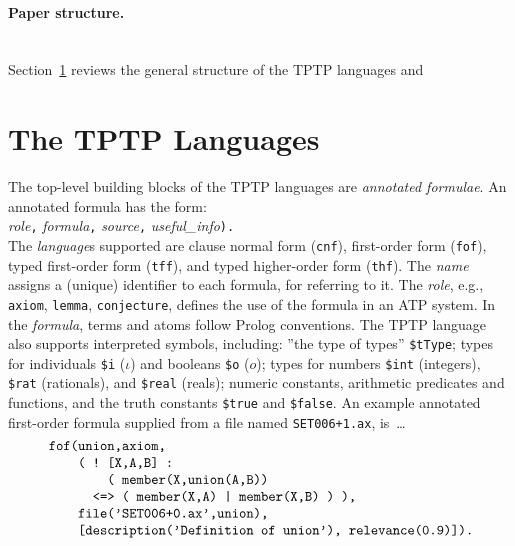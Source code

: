 \documentclass[runningheads]{llncs}
\begin{document}
\paragraph{Paper structure.}~\\
Section~\ref{TPTPLanguages} reviews the general structure of the TPTP languages and

\section{The TPTP Languages}
\label{TPTPLanguages}

The top-level building blocks of the TPTP languages are {\em annotated formulae}.
An annotated formula has the form:\\
 {\em role}{\tt ,} {\em formula}{\tt ,} 
{\em source}{\tt ,} {\em useful\_info}{\tt ).} \\ 
The {\em language}s supported are clause normal form ({\tt cnf}), first-order form ({\tt fof}), 
typed first-order form ({\tt tff}), and typed higher-order form ({\tt thf}).
The {\em name} assigns a (unique) identifier to each formula, for referring to it.
The {\em role}, e.g., {\tt axiom}, {\tt lemma}, {\tt conjecture}, defines the use of the formula 
in an ATP system.
In the {\em formula}, terms and atoms follow Prolog conventions.
The TPTP language also supports interpreted symbols, including: 
''the type of types'' {\tt \$tType};
types for individuals {\tt \$i} ($\iota$) and booleans {\tt \$o} ($o$);
types for numbers {\tt \$int} (integers), {\tt \$rat} (rationals), and {\tt \$real} (reals);
numeric constants,
arithmetic predicates and functions,
and
the truth constants {\tt \$true} and {\tt \$false}.
An example annotated first-order formula supplied from a file named {\tt SET006+1.ax}, is~\ldots
\[
\begin{minipage}{\textwidth}
\begin{verbatim}
    fof(union,axiom,
        ( ! [X,A,B] :
            ( member(X,union(A,B))
          <=> ( member(X,A) | member(X,B) ) ),
        file('SET006+0.ax',union),
        [description('Definition of union'), relevance(0.9)]).
\end{verbatim}
\end{minipage}
\]
\end{document}

